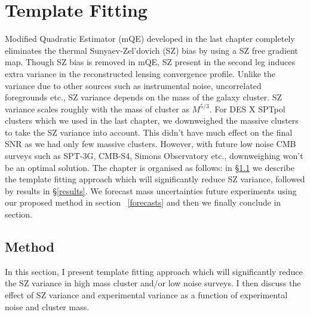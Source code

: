 \chapter{Template Fitting}
\label{ch:template}

Modified Quadratic Estimator (mQE) developed in the last chapter completely eliminates the thermal Sunyaev-Zel'dovich (SZ) bias by using a SZ free gradient map. 
Though SZ bias is removed in mQE, SZ present in the second leg induces extra variance in the reconstructed lensing convergence profile. 
Unlike the variance due to other sources such as instrumental noise, uncorrelated foregrounds etc., SZ variance depends on the mass of the galaxy cluster.
SZ variance scales roughly with the mass of cluster as $M^{5/3}$.
For DES X SPTpol clusters which we used in the last chapter, we downweighed the massive clusters to take the SZ variance into account. 
This didn't have much effect on the final SNR as we had only few massive clusters. 
However, with future low noise CMB surveys such as SPT-3G, CMB-S4, Simons Observatory etc., downweighing won't be an optimal solution.
The chapter is organised as follows: in  \S\ref{sec_methods} we describe the template fitting approach which will significantly reduce SZ variance, followed by results in \S\ref{results}. 
We forecast mass uncertainties future experiments using our proposed method in section ~\ref{forecasts} and then we finally conclude in section.
\section{Method}
\label{sec_methods}
In this section, I present template fitting approach which will significantly reduce the SZ variance in high mass cluster and/or low noise surveys. 
I then discuss the effect of SZ variance and experimental variance as a function of experimental noise and cluster mass. 

